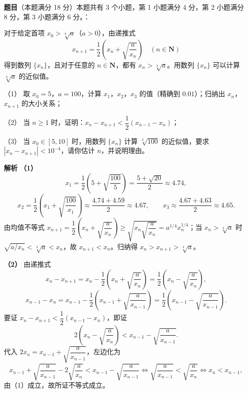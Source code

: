 \begin{answer}



\end{answer}
\begin{answer}

\textbf{题目}（本题满分 18 分）本题共有 3 个小题，第 1 小题满分 4 分，第 2 小题满分 8 分，第 3 小题满分 6 分。：

对于给定首项 $x_0>\sqrt[3]a$（$a>0$），由递推式
\nopagebreak[4]
\[x_{n+1}=\frac12\left(x_n+\sqrt{\frac a{x_n}}\right)\quad(n\in\mathbf N)\]
得到数列 $\{x_n\}$，且对于任意的 $n\in\mathbf N$，都有 $x_n>\sqrt[3]a$。用数列 $\{x_n\}$ 可以计算 $\sqrt[3]a$ 的近似值。

（1） 取 $x_0=5$，$a=100$，计算 $x_1$，$x_2$，$x_3$ 的值（精确到 $0.01$）；归纳出 $x_n$，$x_{n+1}$ 的大小关系；

（2） 当 $n\geqslant1$ 时，证明：$x_n-x_{n+1}<\dfrac12(x_{n-1}-x_n)$；

（3） 当 $x_0\in[5,10]$ 时，用数列 $\{x_n\}$ 计算 $\sqrt[3]{100}$ 的近似值，要求 $|x_n-x_{n+1}|<10^{-4}$，请你估计 $n$，并说明理由。

\clearpage

\textbf{解析}
\textbf{（1）}
\nopagebreak[4]
\[x_1=\frac12\left(5+\sqrt{\frac{100}5}\right)=\frac{5+\sqrt{20}}2\approx4.74,\]
\nopagebreak[4]
\[x_2=\frac12\left(x_1+\sqrt{\frac{100}{x_1}}\right)\approx\frac{4.74+4.59}2\approx4.67,\qquad x_3\approx\frac{4.67+4.63}2\approx4.65.\]
由均值不等式 $x_{n+1}=\dfrac12\left(x_n+\sqrt{\dfrac a{x_n}}\right)\geqslant\sqrt{x_n\sqrt{\dfrac a{x_n}}}=a^{1/4}x_n^{1/4}$；当 $x_n>\sqrt[3]a$ 时 $\sqrt{a/x_n}<\sqrt[3]a<x_n$，故 $x_{n+1}<x_n$。归纳得 $x_n>x_{n+1}>\sqrt[3]a$。

\textbf{（2）}
由递推式
\nopagebreak[4]
\[x_n-x_{n+1}=x_n-\frac12\left(x_n+\sqrt{\frac a{x_n}}\right)=\frac12\left(x_n-\sqrt{\frac a{x_n}}\right),\]
\nopagebreak[4]
\[x_{n-1}-x_n=x_{n-1}-\frac12\left(x_{n-1}+\sqrt{\frac a{x_{n-1}}}\right)=\frac12\left(x_{n-1}-\sqrt{\frac a{x_{n-1}}}\right).\]
要证 $x_n-x_{n+1}<\dfrac12(x_{n-1}-x_n)$，即证
\nopagebreak[4]
\[2\left(x_n-\sqrt{\frac a{x_n}}\right)<x_{n-1}-\sqrt{\frac a{x_{n-1}}}.\]
代入 $2x_n=x_{n-1}+\sqrt{\dfrac a{x_{n-1}}}$，左边化为
\nopagebreak[4]
\[x_{n-1}+\sqrt{\frac a{x_{n-1}}}-2\sqrt{\frac a{x_n}}<x_{n-1}-\sqrt{\frac a{x_{n-1}}}\iff\sqrt{\frac a{x_{n-1}}}<\sqrt{\frac a{x_n}}\iff x_n<x_{n-1},\]
由（1）成立，故所证不等式成立。


\end{answer}
